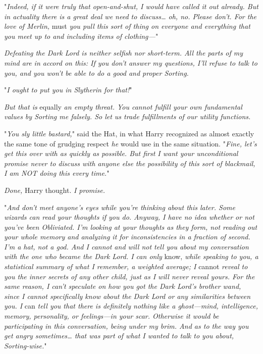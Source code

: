 "\emph{Indeed, if it were truly that open-and-shut, I would have called it out 
already. But in actuality there is a great deal we need to discuss{\ldots} oh, 
no. Please don't. For the love of Merlin,} must \emph{you pull this sort of 
thing on everyone and everything that you meet up to and including items of 
clothing---}"

\emph{Defeating the Dark Lord is neither selfish nor short-term. All the parts 
of my mind are in accord on this: If you don't answer my questions, I'll refuse 
to talk to you, and you won't be able to do a good and proper Sorting.}

"\emph{I ought to put you in Slytherin for that!}"

\emph{But that is} equally \emph{an empty threat. You cannot fulfill your own 
fundamental values by Sorting me falsely. So let us trade fulfillments of our 
utility functions.}

"\emph{You sly little bastard,}" said the Hat, in what Harry recognized as 
almost exactly the same tone of grudging respect \emph{he} would use in the 
same situation. "\emph{Fine, let's get this over with as quickly as possible. 
But first I want your unconditional promise never to discuss with anyone else 
the possibility of this sort of blackmail, I am NOT doing this every time.}"

\emph{Done,} Harry thought. \emph{I promise.}

"\emph{And don't meet anyone's eyes while you're thinking about this later. 
Some wizards can read your thoughts if you do. Anyway, I have no idea whether 
or not you've been Obliviated. I'm looking at your thoughts as they form, not 
reading out your whole memory and analyzing it for inconsistencies in a 
fraction of second. I'm a hat, not a god. And I cannot and will not tell you 
about my conversation with the one who became the Dark Lord. I can only} 
know, \emph{while speaking to you, a statistical summary of what I remember, a 
weighted average; I} cannot \emph{reveal to you the inner secrets of any other 
child, just as I will never reveal yours. For the same reason, I can't 
speculate on how you got the Dark Lord's brother wand, since I cannot 
specifically know about the Dark Lord or any similarities between you. I} 
can \emph{tell you that there is definitely nothing like a ghost---mind, 
intelligence, memory, personality, or feelings---in your scar. Otherwise it 
would be participating in this conversation, being under my brim. And as to the 
way you get angry sometimes{\ldots} that was part of what I wanted to talk to 
you about, Sorting-wise.}"

